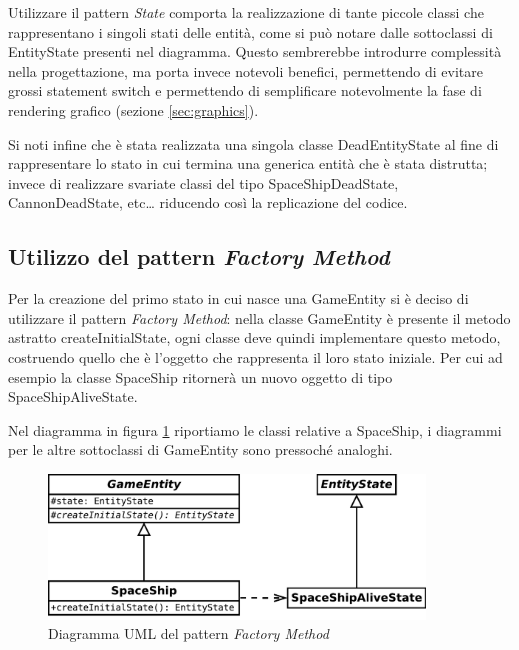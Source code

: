 \documentclass[a4paper,12pt]{article}
\begin{document}
Utilizzare il pattern \emph{State} comporta la realizzazione di tante piccole classi che rappresentano i singoli stati delle entit\`a, come si pu\`o notare dalle sottoclassi di \textsf{EntityState} presenti nel diagramma. Questo sembrerebbe introdurre complessit\`a nella progettazione, ma porta invece notevoli benefici, permettendo di evitare grossi statement switch e permettendo di semplificare notevolmente la fase di rendering grafico (sezione \ref{sec:graphics}).

Si noti infine che \`e stata realizzata una singola classe \textsf{DeadEntityState} al fine di rappresentare lo stato in cui termina una generica entit\`a che \`e stata distrutta; invece di realizzare svariate classi del tipo \textsf{SpaceShipDeadState}, \textsf{CannonDeadState}, etc\dots{} riducendo cos\`i la replicazione del codice.

\subsection{Utilizzo del pattern \emph{Factory Method}}
\label{sec:factory}

Per la creazione del primo stato in cui nasce una \textsf{GameEntity} si \`e deciso di utilizzare il pattern \emph{Factory Method}: nella classe \textsf{GameEntity} \`e presente il metodo astratto \textsf{createInitialState}, ogni classe deve quindi implementare questo metodo, costruendo quello che \`e l'oggetto che rappresenta il loro stato iniziale. Per cui ad esempio la classe \textsf{SpaceShip} ritorner\`a un nuovo oggetto di tipo \textsf{SpaceShipAliveState}.

Nel diagramma in figura \ref{img:FactoryMethod} riportiamo le classi relative a \textsf{SpaceShip}, i diagrammi per le altre sottoclassi di \textsf{GameEntity} sono pressoch\'e analoghi.

\begin{figure}[h]
\centering
\includegraphics[width=10cm]{FactoryMethod.pdf}
\caption{Diagramma UML del pattern \emph{Factory Method}}
\label{img:FactoryMethod}
\end{figure}
\end{document}
